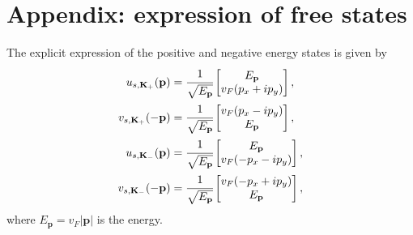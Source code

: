 \documentclass[9pt,twocolumn,twoside]{osajnl}
\begin{document}
\appendix

\section{Appendix: expression of free states}
\label{app:free_states}
The explicit expression of the positive and negative energy states is given by
%
\begin{align}
\label{eq:free_spin1}
u_{s,\mathbf{K}_{+}}(\mathbf{p}) &= 
\cfrac{1}{\sqrt{E_{\mathbf{p}}}}
\begin{bmatrix}
E_{\mathbf{p}} \\
v_{F}(p_{x} + ip_{y} )
\end{bmatrix}, \\ 
%
\label{eq:free_spin2}
v_{s,\mathbf{K}_{+}}(-\mathbf{p}) &= 
\cfrac{1}{\sqrt{E_{\mathbf{p}}}}
\begin{bmatrix}
v_{F}(p_{x} - ip_{y} )\\
E_{\mathbf{p}} 
\end{bmatrix} ,\\
\label{eq:free_spin3}
u_{s,\mathbf{K}_{-}}(\mathbf{p}) &= \cfrac{1}{\sqrt{E_{\mathbf{p}}}}
\begin{bmatrix}
E_{\mathbf{p}} \\
v_{F}(-p_{x} - ip_{y}) 
\end{bmatrix} ,\\
\label{eq:free_spin4}
v_{s,\mathbf{K}_{-}}(-\mathbf{p}) &= \cfrac{1}{\sqrt{E_{\mathbf{p}}}}
\begin{bmatrix}
v_{F}(-p_{x} + ip_{y} )\\
E_{\mathbf{p}} 
\end{bmatrix},
\end{align}
%
where $E_{\textbf{p}} = v_{F}|\mathbf{p}|$ is the energy.


\end{document}
